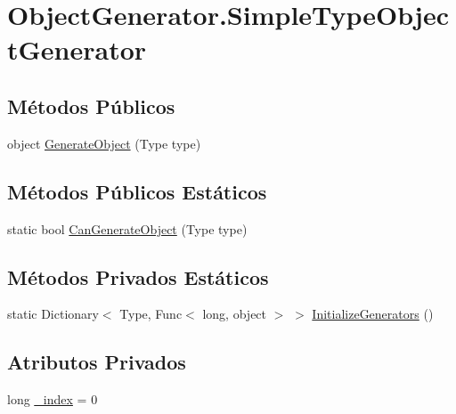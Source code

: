 \hypertarget{classApi3Layers_1_1Areas_1_1HelpPage_1_1ObjectGenerator_1_1SimpleTypeObjectGenerator}{}\section{Object\+Generator.\+Simple\+Type\+Object\+Generator}
\label{classApi3Layers_1_1Areas_1_1HelpPage_1_1ObjectGenerator_1_1SimpleTypeObjectGenerator}
\subsection*{Métodos Públicos}
\begin{DoxyCompactItemize}
\item 
object \hyperlink{classApi3Layers_1_1Areas_1_1HelpPage_1_1ObjectGenerator_1_1SimpleTypeObjectGenerator_a5a661e03cac6c900f73a7e9e6e2d205d}{Generate\+Object} (Type type)
\end{DoxyCompactItemize}
\subsection*{Métodos Públicos Estáticos}
\begin{DoxyCompactItemize}
\item 
static bool \hyperlink{classApi3Layers_1_1Areas_1_1HelpPage_1_1ObjectGenerator_1_1SimpleTypeObjectGenerator_acf923a694d83b6552c7bf4a624f29008}{Can\+Generate\+Object} (Type type)
\end{DoxyCompactItemize}
\subsection*{Métodos Privados Estáticos}
\begin{DoxyCompactItemize}
\item 
static Dictionary$<$ Type, Func$<$ long, object $>$ $>$ \hyperlink{classApi3Layers_1_1Areas_1_1HelpPage_1_1ObjectGenerator_1_1SimpleTypeObjectGenerator_a9d977fe87700eb793b2c9d3833882e88}{Initialize\+Generators} ()
\end{DoxyCompactItemize}
\subsection*{Atributos Privados}
\begin{DoxyCompactItemize}
\item 
long \hyperlink{classApi3Layers_1_1Areas_1_1HelpPage_1_1ObjectGenerator_1_1SimpleTypeObjectGenerator_aada5438fdd43999b6ab741789d0fbf63}{\+\_\+index} = 0
\end{DoxyCompactItemize}

